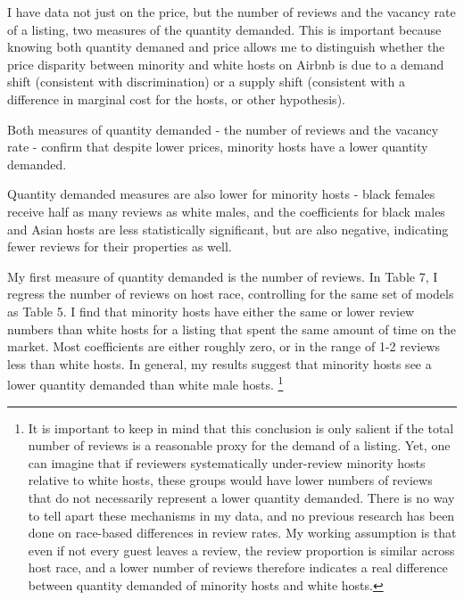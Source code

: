 I have data not just on the price, but the number of reviews and the vacancy rate of a listing, two measures of the quantity demanded. This is important because knowing both quantity demaned and price allows me to distinguish whether the price disparity between minority and white hosts on Airbnb is due to a demand shift (consistent with discrimination) or a supply shift (consistent with a difference in marginal cost for the hosts, or other hypothesis). 

Both measures of quantity demanded - the number of reviews and the vacancy rate - confirm that despite lower prices, minority hosts have a lower quantity demanded. 


Quantity demanded measures are also lower for minority hosts - black females receive half as many reviews as white males, and the coefficients for black males and Asian hosts are less statistically significant, but are also negative, indicating fewer reviews for their properties as well.




My first measure of quantity demanded is the number of reviews. In Table 7, I regress the number of reviews on host race, controlling for the same set of models as Table 5. I find that minority hosts have either the same or lower review numbers than white hosts for a listing that spent the same amount of time on the market. Most coefficients are either roughly zero, or in the range of 1-2 reviews less than white hosts. In general, my results suggest that minority hosts see a lower quantity demanded than white male hosts.%
\footnote{It is important to keep in mind that this conclusion is only salient if the total number of reviews is a reasonable proxy for the demand of a listing. Yet, one can imagine that if reviewers systematically under-review minority hosts relative to white hosts, these groups would have lower numbers of reviews that do not necessarily represent a lower quantity demanded. There is no way to tell apart these mechanisms in my data, and no previous research has been done on race-based differences in review rates. My working assumption is that even if not every guest leaves a review, the review proportion is similar across host race, and a lower number of reviews therefore indicates a real difference between quantity demanded of minority hosts and white hosts. }





